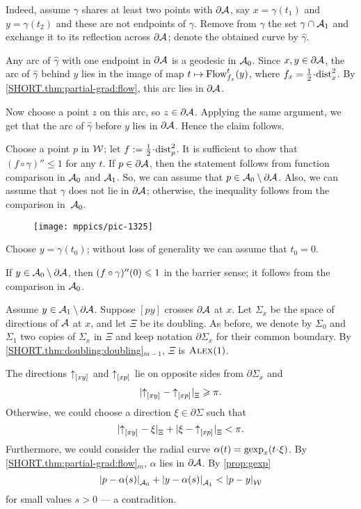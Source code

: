 Indeed, assume $\gamma$ shares at least two points with $\partial \mathcal{A}$, say $x=\gamma(t_1)$ and $y=\gamma(t_2)$ and these are not endpoints of $\gamma$.
Remove from $\gamma$ the set $\gamma\cap \mathcal{A}_1$
and exchange it to its reflection across $\partial\mathcal{A}$;
denote the obtained curve by $\hat\gamma$.

Any arc of $\hat\gamma$ with one endpoint in $\partial \mathcal{A}$
is a geodesic in $\mathcal{A}_0$.
Since $x,y\in \partial \mathcal{A}$, the arc of $\hat\gamma$ behind $y$ lies in the image of map $t\mapsto \mathop{\rm Flow}\nolimits^t_{f_x}(y)$, where $f_x=\tfrac12\cdot\distfun^2_x$.
By \ref{SHORT.thm:partial-grad:flow}, this arc lies in $\partial\mathcal{A}$.

Now choose a point $z$ on this arc, so $z\in \partial\mathcal{A}$.
Applying the same argument, we get that the arc of $\hat\gamma$ before $y$ lies in $\partial\mathcal{A}$.
Hence the claim follows.\claimqeds

Choose a point $p$ in $\mathcal{W}$;
let $f\df\tfrac12\cdot\distfun_p^2$.
It is sufficient to show that $(f\circ\gamma)''\le 1$ for any $t$.
If $p\in \partial\mathcal{A}$, then the statement follows from function comparison in $\mathcal{A}_0$ and $\mathcal{A}_1$.
So, we can assume that $p\in \mathcal{A}_0\setminus \partial\mathcal{A}$.
Also, we can assume that $\gamma$ does not lie in $\partial \mathcal{A}$;
otherwise, the inequality follows from the comparison in~$\mathcal{A}_0$.

\begin{wrapfigure}{r}{55mm}
\vskip-2mm
\centering
\texttt{[image: mppics/pic-1325]}
\end{wrapfigure}

Choose $y=\gamma(t_0)$; without loss of generality we can assume that $t_0=0$.

If $y\in \mathcal{A}_0\setminus\partial\mathcal{A}$, then $(f\circ\gamma)''(0)\leqslant 1$ in the barrier sense;
it follows from the comparison in $\mathcal{A}_0$.

Assume $y\in \mathcal{A}_1\setminus\partial\mathcal{A}$.
Suppose $[py]$ crosses $\partial\mathcal{A}$ at $x$.
Let $\Sigma_x$ be the space of directions of $\mathcal{A}$ at $x$,
and let $\Xi$ be its doubling.
As before, we denote by $\Sigma_0$ and $\Sigma_1$ two copies of $\Sigma_x$ in  $\Xi$
and keep notation $\partial\Sigma_x$ for their common boundary.
By \ref{SHORT.thm:doubling:doubling}$_{m-1}$, $\Xi$ is $\textsc{Alex}(1)$.

The directions ${\uparrow}_{[{x}{y}]_{{}}}$ and ${\uparrow}_{[{x}{p}]_{{}}}$ lie on opposite sides from $\partial\Sigma_x$ and
\[|{{\uparrow}_{[{x}{y}]_{{}}}}-{{\uparrow}_{[{x}{p}]_{{}}}}|_{\Xi}^{{}}\geqslant \pi.\]
Otherwise, we could choose a direction $\xi\in\partial\Sigma$ such that
\[|{{\uparrow}_{[{x}{y}]_{{}}}}-{\xi}|_{\Xi}^{{}}+|{\xi}-{{\uparrow}_{[{x}{p}]_{{}}}}|_{\Xi}^{{}}<\pi.\]
Furthermore, we could consider the radial curve $\alpha(t)=\gexp_x(t\cdot \xi)$.
By \ref{SHORT.thm:partial-grad:flow}$_m$, $\alpha$ lies in $\partial \mathcal{A}$.
By \ref{prop:gexp}
\[\dist{p}{\alpha(s)}{\spc{A}_0}
+\dist{y}{\alpha(s)}{\spc{A}_1}
<\dist{p}{y}{\spc{W}}\]
for small values $s>0$
--- a contradition.

